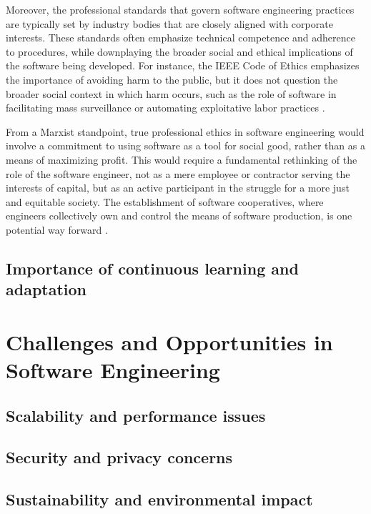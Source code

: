 \begin{refsection}
\begin{multicols}{2}
{Moreover, the professional standards that govern software engineering practices are typically set by industry bodies that are closely aligned with corporate interests. These standards often emphasize technical competence and adherence to procedures, while downplaying the broader social and ethical implications of the software being developed. For instance, the IEEE Code of Ethics emphasizes the importance of avoiding harm to the public, but it does not question the broader social context in which harm occurs, such as the role of software in facilitating mass surveillance or automating exploitative labor practices \cite{winner1986myth}. 

From a Marxist standpoint, true professional ethics in software engineering would involve a commitment to using software as a tool for social good, rather than as a means of maximizing profit. This would require a fundamental rethinking of the role of the software engineer, not as a mere employee or contractor serving the interests of capital, but as an active participant in the struggle for a more just and equitable society. The establishment of software cooperatives, where engineers collectively own and control the means of software production, is one potential way forward \cite{scholz2016platform}.
}

\subsection{Importance of continuous learning and adaptation}
\end{multicols}

\newpage

\section{Challenges and Opportunities in Software Engineering}
\begin{multicols}{2}
\subsection{Scalability and performance issues}
\subsection{Security and privacy concerns}
\subsection{Sustainability and environmental impact}

\end{multicols}
\end{refsection}
